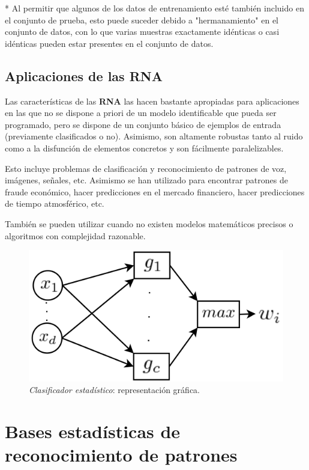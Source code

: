 \documentclass[10pt,a4paper]{article}
\begin{document}
* Al permitir que algunos de los datos de entrenamiento esté también incluido en el conjunto de prueba, esto puede suceder debido a "hermanamiento" en el conjunto de datos, con lo que varias muestras exactamente idénticas o casi idénticas pueden estar presentes en el conjunto de datos.

\subsection{Aplicaciones de las RNA}
Las características de las \textbf{RNA} las hacen bastante apropiadas para aplicaciones en las que no se dispone a priori de un modelo identificable que pueda ser programado, pero se dispone de un conjunto básico de ejemplos de entrada (previamente clasificados o no). Asimismo, son altamente robustas tanto al ruido como a la disfunción de elementos concretos y son fácilmente paralelizables.

Esto incluye problemas de clasificación y reconocimiento de patrones de voz, imágenes, señales, etc. Asimismo se han utilizado para encontrar patrones de fraude económico, hacer predicciones en el mercado financiero, hacer predicciones de tiempo atmosférico, etc.

También se pueden utilizar cuando no existen modelos matemáticos precisos o algoritmos con complejidad razonable.

\begin{figure}
  \label{fig:clasificador}
  \caption{\textit{Clasificador estadístico}: representación gráfica.}
  \centering
  \hbox{\includegraphics[width=0.3\textwidth-\fboxrule-\fboxrule]{clasificador.png}}  
\end{figure}	

\section{Bases estadísticas de reconocimiento de patrones}
\end{document}
